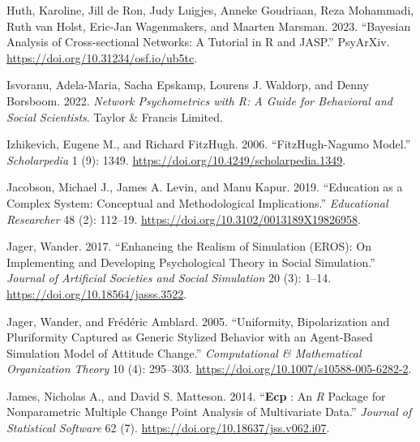 \documentclass[
  a4paper,
  DIV=11,
  numbers=noendperiod,
  oneside]{scrreprt}
\newlength{\cslhangindent}
\newlength{\cslentryspacingunit} %
\newenvironment{CSLReferences}[2] %
 {%
  \setlength{\parindent}{0pt}
  \ifodd #1
  \let\oldpar\par
  \def\par{\hangindent=\cslhangindent\oldpar}
  \fi
  \setlength{\parskip}{#2\cslentryspacingunit}
 }%
 {}
\begin{document}
\begin{CSLReferences}{1}{0}
\leavevmode{}%
Huth, Karoline, Jill de Ron, Judy Luigjes, Anneke Goudriaan, Reza
Mohammadi, Ruth van Holst, Eric-Jan Wagenmakers, and Maarten Marsman.
2023. {``Bayesian {Analysis} of {Cross-sectional Networks}: {A Tutorial}
in {R} and {JASP}.''} {PsyArXiv}.
\url{https://doi.org/10.31234/osf.io/ub5tc}.

\leavevmode{}%
Isvoranu, Adela-Maria, Sacha Epskamp, Lourens J. Waldorp, and Denny
Borsboom. 2022. \emph{Network {Psychometrics} with {R}: {A Guide} for
{Behavioral} and {Social Scientists}}. {Taylor \& Francis Limited}.

\leavevmode{}%
Izhikevich, Eugene M., and Richard FitzHugh. 2006. {``{FitzHugh-Nagumo}
Model.''} \emph{Scholarpedia} 1 (9): 1349.
\url{https://doi.org/10.4249/scholarpedia.1349}.

\leavevmode{}%
Jacobson, Michael J., James A. Levin, and Manu Kapur. 2019. {``Education
as a {Complex System}: {Conceptual} and {Methodological
Implications}.''} \emph{Educational Researcher} 48 (2): 112--19.
\url{https://doi.org/10.3102/0013189X19826958}.

\leavevmode{}%
Jager, Wander. 2017. {``Enhancing the {Realism} of {Simulation}
({EROS}): {On Implementing} and {Developing Psychological Theory} in
{Social Simulation}.''} \emph{Journal of Artificial Societies and Social
Simulation} 20 (3): 1--14. \url{https://doi.org/10.18564/jasss.3522}.

\leavevmode{}%
Jager, Wander, and Frédéric Amblard. 2005. {``Uniformity,
{Bipolarization} and {Pluriformity Captured} as {Generic Stylized
Behavior} with an {Agent-Based Simulation Model} of {Attitude
Change}.''} \emph{Computational \& Mathematical Organization Theory} 10
(4): 295--303. \url{https://doi.org/10.1007/s10588-005-6282-2}.

\leavevmode{}%
James, Nicholas A., and David S. Matteson. 2014. {``{\textbf{Ecp}} :
{An} {\emph{R}} {Package} for {Nonparametric Multiple Change Point
Analysis} of {Multivariate Data}.''} \emph{Journal of Statistical
Software} 62 (7). \url{https://doi.org/10.18637/jss.v062.i07}.


\end{CSLReferences}
\end{document}
